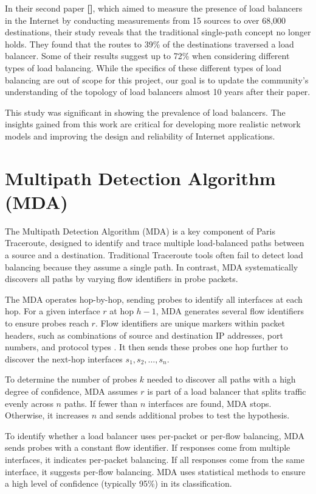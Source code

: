 \documentclass[12pt]{cwru_thesis}
\begin{document}
In their second paper \textbf{[\cite{augustin2010measuring}]}, which aimed to measure the presence of load balancers in the Internet by conducting measurements from 15 sources to over 68,000 destinations, their study reveals that the traditional single-path concept no longer holds. They found that the routes to 39\% of the destinations traversed a load balancer. Some of their results suggest up to 72\% when considering different types of load balancing. While the specifics of these different types of load balancing are out of scope for this project, our goal is to update the community's understanding of the topology of load balancers almost 10 years after their paper.


This study was significant in showing the prevalence of load balancers. The insights gained from this work are critical for developing more realistic network models and improving the design and reliability of Internet applications.



\section{Multipath Detection Algorithm (MDA)}

The Multipath Detection Algorithm (MDA) is a key component of Paris Traceroute, designed to identify and trace multiple load-balanced paths between a source and a destination. Traditional Traceroute tools often fail to detect load balancing because they assume a single path. In contrast, MDA systematically discovers all paths by varying flow identifiers in probe packets.

The MDA operates hop-by-hop, sending probes to identify all interfaces at each hop. For a given interface \(r\) at hop \(h-1\), MDA generates several flow identifiers to ensure probes reach \(r\). Flow identifiers are unique markers within packet headers, such as combinations of source and destination IP addresses, port numbers, and protocol types . It then sends these probes one hop further to discover the next-hop interfaces \(s_1, s_2, \ldots, s_n\).

To determine the number of probes \(k\) needed to discover all paths with a high degree of confidence, MDA assumes \(r\) is part of a load balancer that splits traffic evenly across \(n\) paths. If fewer than \(n\) interfaces are found, MDA stops. Otherwise, it increases \(n\) and sends additional probes to test the hypothesis.

To identify whether a load balancer uses per-packet or per-flow balancing, MDA sends probes with a constant flow identifier. If responses come from multiple interfaces, it indicates per-packet balancing. If all responses come from the same interface, it suggests per-flow balancing. MDA uses statistical methods to ensure a high level of confidence (typically 95\%) in its classification.
\end{document}
